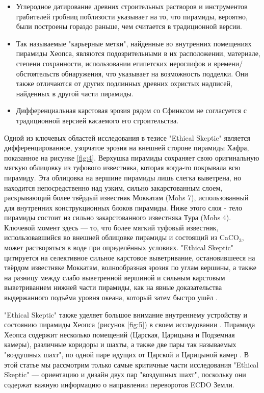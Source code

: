 \documentclass[10pt,twocolumn,letterpaper]{article}
\begin{document}
\begin{flushleft}
\begin{itemize}
    \item Углеродное датирование древних строительных растворов и инструментов грабителей гробниц поблизости указывает на то, что пирамиды, вероятно, были построены гораздо раньше, чем считается в традиционной версии.
    \item Так называемые "карьерные метки", найденные во внутренних помещениях пирамиды Хеопса, являются подозрительными в их расположении, материале, степени сохранности, использовании египетских иероглифов и времени/обстоятельств обнаружения, что указывает на возможность подделки. Они также отличаются от других подлинных древних охристых надписей, найденных в другой части пирамиды.
    \item Дифференциальная карстовая эрозия рядом со Сфинксом не согласуется с традиционной версией касаемого его строительства.
\end{itemize}
\end{flushleft}

Одной из ключевых областей исследования в тезисе "Ethical Skeptic" является дифференцированное, узорчатое эрозия на внешней стороне пирамиды Хафра, показанное на рисунке \ref{fig:4}. Верхушка пирамиды сохраняет свою оригинальную мягкую облицовку из туфового известняка, которая когда-то покрывала всю пирамиду. Эта облицовка на вершине пирамиды лишь слегка выветрена, но находится непосредственно над узким, сильно закарстованным слоем, раскрывающий более твёрдый известняк Моккатам (Mohs 7), использованный для внутренних конструкционных блоков пирамиды. Ниже этого слоя - тело пирамиды состоит из сильно закарстованного известняка Тура (Mohs 4). Ключевой момент здесь — то, что более мягкий туфовый известняк, использовавшийся во внешней облицовке пирамиды и состоящий из CaCO$_3$, может растворяться в воде при определённых условиях. "Ethical Skeptic" цитируется на селективное сильное карстовое выветривание, остановившееся на твёрдом известняке Моккатам, волнообразная эрозия по углам вершины, а также на разницу между слабо выветренной вершиной и сильным карстовым выветриванием нижней части пирамиды, как на явные доказательства выдержанного подъёма уровня океана, который затем быстро ушёл \cite{27}.

"Ethical Skeptic" также уделяет большое внимание внутреннему устройству и состоянию пирамиды Хеопса (рисунок \ref{fig:5}) в своем исследовании \cite{28}. Пирамида Хеопса содержит несколько помещений (Царская, Царицына и Подземная камеры), различные коридоры и шахты, а также две пары так называемых "воздушных шахт", по одной паре идущих от Царской и Царицыной камер \cite{29,30}. В этой статье мы рассмотрим только самые критичные части исследования "Ethical Skeptic" — ориентацию и дизайн двух пар "воздушных шахт", поскольку они содержат важную информацию о направлении переворотов ECDO Земли.
\end{document}
